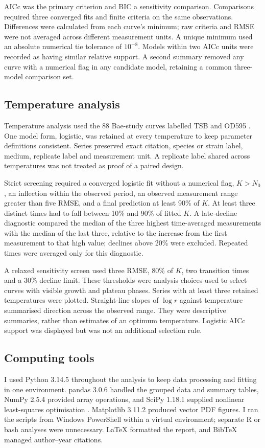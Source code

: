 \documentclass[11pt,a4paper]{article}
\begin{document}
AICc was the primary criterion and BIC a sensitivity comparison. Comparisons required three converged fits and finite criteria on the same observations. Differences were calculated from each curve's minimum; raw criteria and RMSE were not averaged across different measurement units. A unique minimum used an absolute numerical tie tolerance of $10^{-8}$. Models within two AICc units were recorded as having similar relative support. A second summary removed any curve with a numerical flag in any candidate model, retaining a common three-model comparison set.

\subsection{Temperature analysis}
Temperature analysis used the 88 Bae-study curves labelled TSB and OD595 \citep{Bae2014}. One model form, logistic, was retained at every temperature to keep parameter definitions consistent. Series preserved exact citation, species or strain label, medium, replicate label and measurement unit. A replicate label shared across temperatures was not treated as proof of a paired design.

Strict screening required a converged logistic fit without a numerical flag, $K>N_0$, an inflection within the observed period, an observed measurement range greater than five RMSE, and a final prediction at least 90\% of $K$. At least three distinct times had to fall between 10\% and 90\% of fitted $K$. A late-decline diagnostic compared the median of the three highest time-averaged measurements with the median of the last three, relative to the increase from the first measurement to that high value; declines above 20\% were excluded. Repeated times were averaged only for this diagnostic.

A relaxed sensitivity screen used three RMSE, 80\% of $K$, two transition times and a 30\% decline limit. These thresholds were analysis choices used to select curves with visible growth and plateau phases. Series with at least three retained temperatures were plotted. Straight-line slopes of $\log r$ against temperature summarised direction across the observed range. They were descriptive summaries, rather than estimates of an optimum temperature. Logistic AICc support was displayed but was not an additional selection rule.

\subsection{Computing tools}
I used Python 3.14.5 throughout the analysis to keep data processing and fitting in one environment. pandas 3.0.6 handled the grouped data and summary tables, NumPy 2.5.4 provided array operations, and SciPy 1.18.1 supplied nonlinear least-squares optimisation \citep{Virtanen2020}. Matplotlib 3.11.2 produced vector PDF figures. I ran the scripts from Windows PowerShell within a virtual environment; separate R or bash analyses were unnecessary. LaTeX formatted the report, and BibTeX managed author--year citations.
\end{document}

